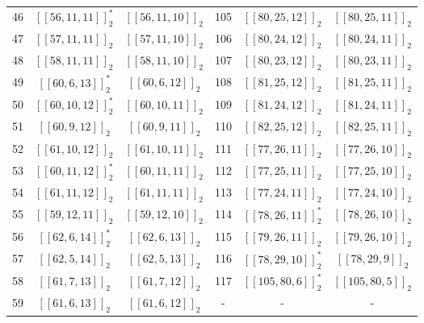 \documentclass[journal]{IEEEtran}
\begin{document}
\begin{table}[!t]
\begin{threeparttable}
\begin{tabular}{cccccc}
			46  &   $[[56,11,11]]_2^*$    &       $[[56,11,10]]_2$        & 105 &    $[[80,25,12]]_2$     &       $[[80,25,11]]_2$        \\
			47  &    $[[57,11,11]]_2$     &       $[[57,11,10]]_2$        & 106 &    $[[80,24,12]]_2$     &       $[[80,24,11]]_2$        \\
			48  &    $[[58,11,11]]_2$     &       $[[58,11,10]]_2$        & 107 &    $[[80,23,12]]_2$     &       $[[80,23,11]]_2$        \\
			49  &    $[[60,6,13]]_2^*$    &        $[[60,6,12]]_2$        & 108 &    $[[81,25,12]]_2$     &       $[[81,25,11]]_2$        \\
			50  &   $[[60,10,12]]_2^*$    &       $[[60,10,11]]_2$        & 109 &    $[[81,24,12]]_2$     &       $[[81,24,11]]_2$        \\
			51  &     $[[60,9,12]]_2$     &        $[[60,9,11]]_2$        & 110 &    $[[82,25,12]]_2$     &       $[[82,25,11]]_2$        \\
			52  &    $[[61,10,12]]_2$     &       $[[61,10,11]]_2$        & 111 &    $[[77,26,11]]_2$     &       $[[77,26,10]]_2$        \\
			53  &   $[[60,11,12]]_2^*$    &       $[[60,11,11]]_2$        & 112 &    $[[77,25,11]]_2$     &       $[[77,25,10]]_2$        \\
			54  &    $[[61,11,12]]_2$     &       $[[61,11,11]]_2$        & 113 &    $[[77,24,11]]_2$     &       $[[77,24,10]]_2$        \\
			55  &    $[[59,12,11]]_2$     &       $[[59,12,10]]_2$        & 114 &   $[[78,26,11]]_2^*$    &       $[[78,26,10]]_2$        \\
			56  &    $[[62,6,14]]_2^*$    &        $[[62,6,13]]_2$        & 115 &    $[[79,26,11]]_2$     &       $[[79,26,10]]_2$        \\
			57  &     $[[62,5,14]]_2$     &        $[[62,5,13]]_2$        & 116 &   $[[78,29,10]]_2^*$    &        $[[78,29,9]]_2$        \\
			58  &     $[[61,7,13]]_2$     &        $[[61,7,12]]_2$        & 117 &   $[[105,80,6]]_2^*$    &       $[[105,80,5]]_2$        \\
			59  &     $[[61,6,13]]_2$     &        $[[61,6,12]]_2$        &  -  &            -            &               -               \\ \hline
		\end{tabular}
		\begin{tablenotes}    %
			\footnotesize               %

\end{tablenotes}
\end{threeparttable}
\end{table}
\end{document}
